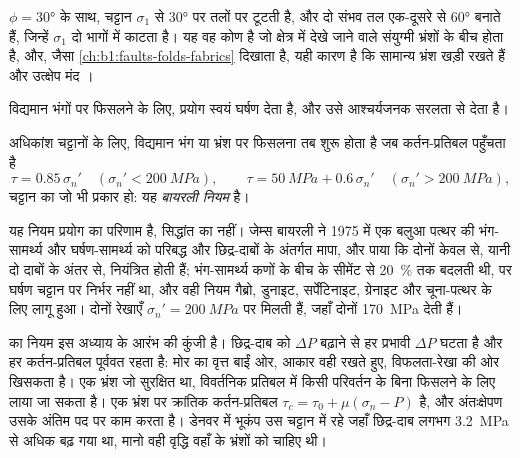 $\phi = \ang{30}$ के साथ, चट्टान $\sigma_1$ से \ang{30} पर तलों पर टूटती है, और दो संभव तल एक-दूसरे से \ang{60} बनाते हैं, जिन्हें $\sigma_1$ दो भागों में काटता है। यह वह कोण है जो क्षेत्र में देखे जाने वाले संयुग्मी भ्रंशों के बीच होता है, और, जैसा \cref{ch:b1:faults-folds-fabrics} दिखाता है, यही कारण है कि सामान्य भ्रंश खड़ी  रखते हैं और उत्क्षेप मंद ।

विद्यमान भंगों पर फिसलने के लिए, प्रयोग स्वयं घर्षण देता है, और उसे आश्चर्यजनक सरलता से देता है।

\begin{proposition}[बायरली नियम]
\label{prop:b1:stress-strain-rheology:byerlee}
अधिकांश चट्टानों के लिए, विद्यमान भंग या भ्रंश पर फिसलना तब शुरू होता है जब कर्तन-प्रतिबल पहुँचता है
\[
  \tau = 0.85\,\sigma_n' \quad (\sigma_n' < \qty{200}{MPa}), \qquad
  \tau = \qty{50}{MPa} + 0.6\,\sigma_n' \quad (\sigma_n' > \qty{200}{MPa}),
\]
चट्टान का जो भी प्रकार हो: यह \emph{बायरली नियम} है।
\end{proposition}
\admitted

यह नियम प्रयोग का परिणाम है, सिद्धांत का नहीं। जेम्स बायरली ने 1975 में एक बलुआ पत्थर की भंग-सामर्थ्य और घर्षण-सामर्थ्य को परिबद्ध और छिद्र-दाबों के अंतर्गत मापा, और पाया कि दोनों केवल  से, यानी दो दाबों के अंतर से, नियंत्रित होती हैं; भंग-सामर्थ्य कणों के बीच के सीमेंट से \qty{20}{\percent} तक बदलती थी, पर घर्षण चट्टान पर निर्भर नहीं था, और वही नियम गैब्रो, डुनाइट, सर्पेंटिनाइट, ग्रेनाइट और चूना-पत्थर के लिए लागू हुआ। दोनों रेखाएँ $\sigma_n' = \qty{200}{MPa}$ पर मिलती हैं, जहाँ दोनों \qty{170}{MPa} देती हैं।

 का नियम इस अध्याय के आरंभ की कुंजी है। छिद्र-दाब को $\Delta P$ बढ़ाने से हर प्रभावी  $\Delta P$ घटता है और हर कर्तन-प्रतिबल पूर्ववत रहता है: मोर का वृत्त बाईं ओर, आकार वही रखते हुए, विफलता-रेखा की ओर खिसकता है। एक भ्रंश जो सुरक्षित था, विवर्तनिक प्रतिबल में किसी परिवर्तन के बिना फिसलने के लिए लाया जा सकता है। एक भ्रंश पर क्रांतिक कर्तन-प्रतिबल $\tau_c = \tau_0 + \mu(\sigma_n - P)$ है, और अंतःक्षेपण उसके अंतिम पद पर काम करता है। डेनवर में भूकंप उस चट्टान में रहे जहाँ छिद्र-दाब लगभग \qty{3.2}{MPa} से अधिक बढ़ गया था, मानो वही वृद्धि वहाँ के भ्रंशों को चाहिए थी।


